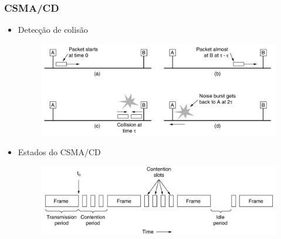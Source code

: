 \begin{frame}
	\frametitle{CSMA/CD}
	
	\begin{itemize}
	    \item Detecção de colisão
	    \begin{figure}[t]
		\begin{center}
			\includegraphics[width=0.7\columnwidth]{figs/fig04-15}
		\end{center}
	    \end{figure}
	    \item Estados do CSMA/CD
	    \begin{figure}[t]
		\begin{center}
			\includegraphics[width=0.6\columnwidth]{figs/fig04-05}
		\end{center}
	    \end{figure}
	\end{itemize}
	
\end{frame}
